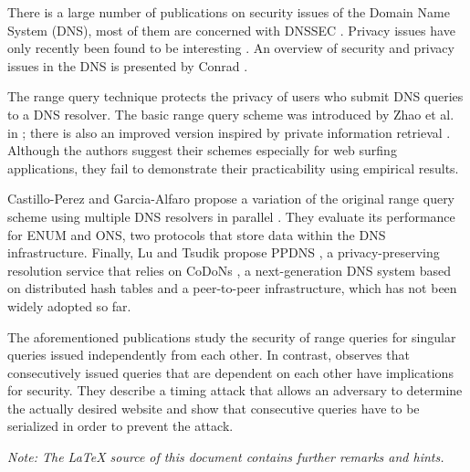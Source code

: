 \documentclass[a4paper]{llncs}
\begin{document}
\vspace{20pt}

There is a large number of publications on security issues of the Domain Name System (DNS), most of them are concerned with DNSSEC \cite{rfc4033}. Privacy issues have only recently been found to be interesting \cite{rfc7626}. An overview of security and privacy issues in the DNS is presented by Conrad \cite{Conrad12-dnssecurity}.

The range query technique protects the privacy of users who submit DNS queries to a DNS resolver. The basic range query scheme was introduced by Zhao et al. in \cite{Zhao:2007a}; there is also an improved version \cite{Zhao:2007b} inspired by private information retrieval \cite{Chor:1995}.
Although the authors suggest their schemes especially for web surfing applications, they fail to demonstrate their practicability using empirical results.

Castillo-Perez and Garcia-Alfaro propose a variation of the original range query scheme \cite{Zhao:2007a} using multiple DNS resolvers in parallel \cite{Castillo-Perez:2008,Castillo-Perez:2009}. They evaluate its performance for ENUM and ONS, two protocols that store data within the DNS infrastructure. Finally, Lu and Tsudik propose PPDNS \cite{Lu:2010}, a privacy-preserving resolution service that relies on CoDoNs \cite{RamasubramanianS04-codons}, a next-generation DNS system based on distributed hash tables and a peer-to-peer infrastructure, which has not been widely adopted so far.

The aforementioned publications study the security of range queries for singular queries issued independently from each other. In contrast, \cite{FederrathFHP11-dnsmixes} observes that consecutively issued queries that are dependent on each other have implications for security. They describe a timing attack that allows an adversary to determine the actually desired website and show that consecutive queries have to be serialized in order to prevent the attack.

\bigskip
\noindent\emph{Note: The LaTeX source of this document contains further remarks and hints.}







\end{document}
